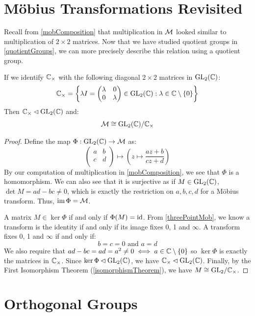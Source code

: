 \documentclass[../main.tex]{subfiles}
\begin{document}
\section{M\"obius Transformations Revisited}
Recall from \cref{mobComposition} that multiplication in $\mathcal{M}$ looked similar to multiplication of $2 \times 2$ matrices.
Now that we have studied quotient groups in \cref{quotientGroups}, we can more precisely describe this relation using a quotient group.
\begin{proposition}
  If we identify $\mathbb{C}_\times$ with the following diagonal $2 \times 2$ matrices in $\mathrm{GL}_2(\mathbb{C})$:
  \[
    \mathbb{C}_{\times} = \left\{ \lambda I = \begin{pmatrix}
    \lambda & 0 \\
    0 & \lambda \\
    \end{pmatrix} \in \mathrm{GL}_2(\mathbb{C}) : \lambda \in \mathbb{C} \setminus \{0\} \right\}
  \]
  Then $\mathbb{C}_\times \lhd \mathrm{GL}_2(\mathbb{C})$ and:
  \[
    \mathcal{M} \cong \mathrm{GL}_2(\mathbb{C})/\mathbb{C}_\times
  \]
\end{proposition}
\begin{proof}
  Define the map $\Phi: \mathrm{GL}_2(\mathbb{C}) \to \mathcal{M}$ as:
  \[
    \begin{pmatrix}
    a & b \\
    c & d \\
    \end{pmatrix} \mapsto
    \left(z \mapsto \frac{az + b}{cz + d}\right)
  \]
  By our computation of multiplication in \cref{mobComposition}, we see that $\Phi$ is a homomorphism.
  We can also see that it is surjective as if $M \in \mathrm{GL}_2(\mathbb{C})$, $\det M = ad - bc \neq 0$, which is exactly the restriction on $a, b, c, d$ for a M\"obius transform.
  Thus, $\operatorname{im} \Phi = \mathcal{M}$.

  A matrix $M \in \ker \Phi$ if and only if $\Phi(M) = \mathrm{id}$.
  From \cref{threePointMob}, we know a transform is the identity if and only if its image fixes 0, 1 and $\infty$.
  A transform fixes 0, 1 and $\infty$ if and only if:
  \[
    b = c = 0 \text{ and } a = d
  \]
  We also require that $ad - bc = ad = a^2 \neq 0 \iff a \in \mathbb{C} \setminus \{0\}$ so $\ker \Phi$ is exactly the matrices in $\mathbb{C}_\times$.
  Since $\ker \Phi \lhd \mathrm{GL}_2(\mathbb{C})$, we have $\mathbb{C}_\times \lhd \mathrm{GL}_2(\mathbb{C})$.
  Finally, by the First Isomorphism Theorem (\cref{isomorphismTheorem}), we have $M \cong \mathrm{GL}_2 /\mathbb{C}_\times$.
\end{proof}
\section{Orthogonal Groups}
\end{document}
